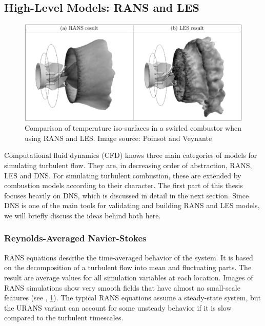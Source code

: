 \subsection[High-Level Models: RANS and LES]
           {High-Level Models: \acs{RANS} and \acs{LES}} %
\label{sub:high_level_models}
%
\begin{figure}[t]
    \centering
    \includegraphics[width=\textwidth]{figures/rans_vs_les.png}
    \caption{Comparison of temperature iso-surfaces in a swirled combustor when
    using \ac{RANS} and \ac{LES}. Image source: Poinsot and Veynante
    \cite{Poinsot2012}}
    \label{fig:rans_vs_les}
\end{figure}
%
Computational fluid dynamics (\acs{CFD}) knows three main categories
of models for simulating turbulent flow.
%
They are, in decreasing order of abstraction, \acf{RANS}, \acf{LES} and
\acf{DNS}.
%
For simulating turbulent combustion, these are extended by combustion models
according to their character.
%
The first part of this thesis focuses heavily on \ac{DNS}, which is discussed in
detail in the next section.
%
Since \ac{DNS} is one of the main tools for validating and building \ac{RANS}
and \ac{LES} models, we will briefly discuss the ideas behind both here.
%
\subsubsection{Reynolds-Averaged Navier-Stokes} %
\label{ssub:rans}
%
\acl{RANS} equations describe the time-averaged behavior of the system.
%
It is based on the decomposition of a turbulent flow into mean and
fluctuating parts.
%
The result are average values for all simulation variables at each location.
%
Images of \ac{RANS} simulations show very smooth fields that have almost no
small-scale features (see \eg, \cref{fig:rans_vs_les}).
%
The typical \ac{RANS} equations assume a steady-state system, but the \ac{URANS}
variant can account for some unsteady behavior if it is slow compared to the
turbulent timescales.
%

